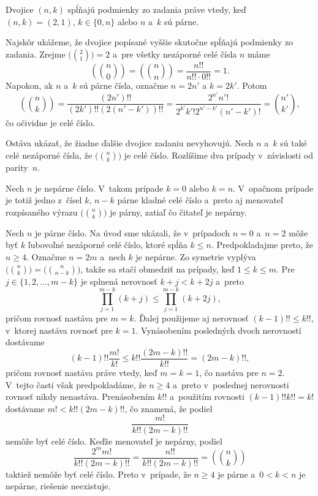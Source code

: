 {%
\def\bibinom#1#2{\left(\!\!\binom{#1}{#2}\!\!\right)}
\def\tbibinom#1#2{\bigl(\!\!\binom{#1}{#2}\!\!\bigr)}
Dvojice $(n,k)$ spĺňajú podmienky zo zadania práve vtedy, keď $(n,k) = (2,1)$, $k\in\{0,n\}$ alebo $n$ a~$k$ sú párne.

Najskôr ukážeme, že dvojice popísané vyššie skutočne spĺňajú podmienky zo zadania. Zrejme $\tbibinom{2}{1} = 2$ a~pre všetky nezáporné celé čísla $n$ máme
$$
\bibinom{n}{0} = \bibinom{n}{n} = \frac{n!!}{n!!\cdot 0!!} = 1.
$$
Napokon, ak $n$ a~$k$ sú párne čísla, označme $n = 2n'$ a $k = 2k'$. Potom
$$
\bibinom{n}{k} = \frac{(2n')!!}{(2k')!!(2(n'-k'))!!} = \frac{2^{n'}n'!}{2^{k'}k'!2^{n'-k'}(n'-k')!} = \binom{n'}{k'},
$$
čo očividne je celé číslo.

Ostáva ukázať, že žiadne ďalšie dvojice zadaniu nevyhovujú.
Nech $n$ a~$k$ sú také celé nezáporné čísla, že $\tbibinom{n}{k}$ je celé číslo. Rozlíšime dva prípady v~závislosti od parity~$n$.

Nech $n$ je nepárne číslo. V~takom prípade $k = 0$ alebo $k=n$. V~opačnom prípade je totiž jedno z~čísel $k$, $n-k$ párne kladné celé číslo a~preto aj menovateľ rozpísaného výrazu $\tbibinom{n}{k}$ je párny, zatiaľ čo čitateľ je nepárny.

Nech $n$ je párne číslo. Na úvod sme ukázali, že v~prípadoch $n=0$ a~$n=2$ môže byť $k$ ľubovoľné nezáporné celé číslo, ktoré spĺňa $k\le n$. Predpokladajme preto, že $n\ge 4$. Označme $n = 2m$ a~nech $k$ je nepárne. Zo symetrie vyplýva $\tbibinom{n}{k} = \tbibinom{n}{n-k}$, takže sa stačí obmedziť na prípady, keď $1 \le k \le m$. Pre $j \in \{1,2,\dots,m-k\}$ je splnená nerovnosť $k+j < k+2j$ a~preto
$$
\prod_{j = 1}^{m-k}(k+j) \leq \prod_{j=1}^{m-k}(k+2j),
$$
pričom rovnosť nastáva pre $m=k$. Ďalej použijeme aj nerovnosť $(k-1)!!\le k!!$, v~ktorej nastáva rovnosť pre $k=1$. Vynásobením posledných dvoch nerovností dostávame
$$
(k-1)!!\frac{m!}{k!} \leq k!! \frac{(2m-k)!!}{k!!} = (2m-k)!!,
$$
pričom rovnosť nastáva práve vtedy, keď $m=k=1$, čo nastáva pre $n=2$. V~tejto časti však predpokladáme, že $n\ge 4$ a~preto v~poslednej nerovnosti rovnosť nikdy nenastáva. Prenásobením $k!!$ a~použitím rovnosti $(k-1)!!k!!=k!$ dostávame $m! < k!!(2m-k)!!$, čo znamená, že podiel
$$
\frac{m!}{k!!(2m-k)!!}
$$
nemôže byť celé číslo. Keďže menovateľ je nepárny, podiel
$$
\frac{2^mm!}{k!!(2m-k)!!} = \frac{n!!}{k!!(2m-k)!!} = \bibinom{n}{k}
$$
taktiež nemôže byť celé číslo. Preto v~prípade, že $n\ge 4$ je párne a~$0< k < n$ je nepárne, riešenie neexistuje.
}


